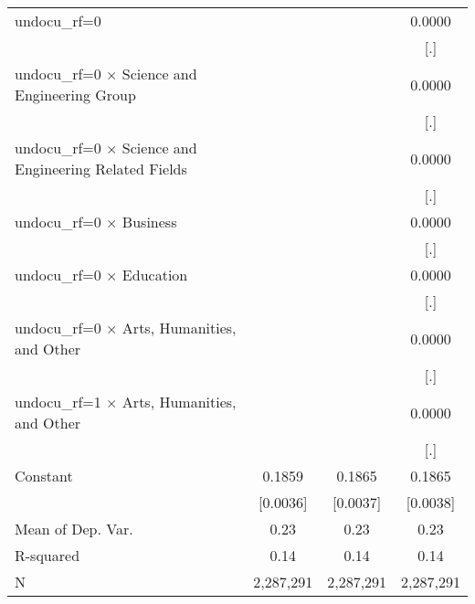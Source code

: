 \begin{table}[htbp]
\begin{tabular}{l*{3}{c}}
\addlinespace
undocu\_rf=0         &                     &                     &      0.0000         \\
                    &                     &                     &         [.]         \\
\addlinespace
undocu\_rf=0 $\times$ Science and Engineering Group&                     &                     &      0.0000         \\
                    &                     &                     &         [.]         \\
\addlinespace
undocu\_rf=0 $\times$ Science and Engineering Related Fields&                     &                     &      0.0000         \\
                    &                     &                     &         [.]         \\
\addlinespace
undocu\_rf=0 $\times$ Business&                     &                     &      0.0000         \\
                    &                     &                     &         [.]         \\
\addlinespace
undocu\_rf=0 $\times$ Education&                     &                     &      0.0000         \\
                    &                     &                     &         [.]         \\
\addlinespace
undocu\_rf=0 $\times$ Arts, Humanities, and Other&                     &                     &      0.0000         \\
                    &                     &                     &         [.]         \\
\addlinespace
undocu\_rf=1 $\times$ Arts, Humanities, and Other&                     &                     &      0.0000         \\
                    &                     &                     &         [.]         \\
\addlinespace
Constant            &      0.1859\sym{***}&      0.1865\sym{***}&      0.1865\sym{***}\\
                    &    [0.0036]         &    [0.0037]         &    [0.0038]         \\
\midrule
Mean of Dep. Var.   &        0.23         &        0.23         &        0.23         \\
R-squared           &        0.14         &        0.14         &        0.14         \\
N                   &   2,287,291         &   2,287,291         &   2,287,291         \\

\end{tabular}
\end{table}
